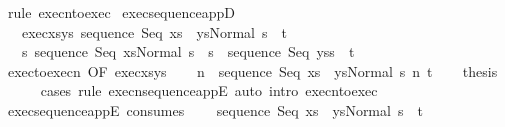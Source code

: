 \begin{isabellebody}
\ {\isacharparenleft}rule\ execn{\isacharunderscore}to{\isacharunderscore}exec{\isacharparenright}\isanewline
{}\isamarkupfalse%
%
\endisatagproof
{\isafoldproof}%
%
\isadelimproof
\isanewline
%
\endisadelimproof
\isanewline
{}\isamarkupfalse%
\ exec{\isacharunderscore}sequence{\isacharunderscore}appD{\isacharcolon}\ \isanewline
\ \ \ exec{\isacharunderscore}xs{\isacharunderscore}ys{\isacharcolon}\ {\isachardoublequoteopen}{\isasymGamma}{\isasymturnstile}{\isasymlangle}sequence\ Seq\ {\isacharparenleft}xs\ {\isacharat}\ ys{\isacharparenright}{\isacharcomma}Normal\ s{\isasymrangle}\ {\isasymRightarrow}\ t{\isachardoublequoteclose}\isanewline
\ \ \ {\isachardoublequoteopen}{\isasymexists}s{\isacharprime}{\isachardot}\ {\isasymGamma}{\isasymturnstile}{\isasymlangle}sequence\ Seq\ xs{\isacharcomma}Normal\ s{\isasymrangle}\ {\isasymRightarrow}\ s{\isacharprime}\ {\isasymand}\ {\isasymGamma}{\isasymturnstile}{\isasymlangle}sequence\ Seq\ ys{\isacharcomma}s{\isacharprime}{\isasymrangle}\ {\isasymRightarrow}\ t{\isachardoublequoteclose}\isanewline
%
\isadelimproof
%
\endisadelimproof
%
\isatagproof
{}\isamarkupfalse%
\ {\isacharminus}\isanewline
\ \ \isamarkupfalse%
\ exec{\isacharunderscore}to{\isacharunderscore}execn\ {\isacharbrackleft}OF\ exec{\isacharunderscore}xs{\isacharunderscore}ys{\isacharbrackright}\isanewline
\ \ \isamarkupfalse%
\ n\ \ {\isachardoublequoteopen}{\isasymGamma}{\isasymturnstile}{\isasymlangle}sequence\ Seq\ {\isacharparenleft}xs\ {\isacharat}\ ys{\isacharparenright}{\isacharcomma}Normal\ s{\isasymrangle}\ {\isacharequal}n{\isasymRightarrow}\ t{\isachardoublequoteclose}\isacommand{{\isachardot}{\isachardot}}\isamarkupfalse%
\isanewline
\ \ \isamarkupfalse%
\ {\isacharquery}thesis\isanewline
\ \ \ \ \isamarkupfalse%
\ {\isacharparenleft}cases\ rule{\isacharcolon}\ execn{\isacharunderscore}sequence{\isacharunderscore}appE{\isacharparenright}\ {\isacharparenleft}auto\ intro{\isacharcolon}\ execn{\isacharunderscore}to{\isacharunderscore}exec{\isacharparenright}\isanewline
{}\isamarkupfalse%
%
\endisatagproof
{\isafoldproof}%
%
\isadelimproof
\isanewline
%
\endisadelimproof
\isanewline
\isanewline
{}\isamarkupfalse%
\ exec{\isacharunderscore}sequence{\isacharunderscore}appE\ {\isacharbrackleft}consumes\ {}{\isacharbrackright}{\isacharcolon}\ \isanewline
\ \ {\isachardoublequoteopen}{\isasymlbrakk}{\isasymGamma}{\isasymturnstile}{\isasymlangle}sequence\ Seq\ {\isacharparenleft}xs\ {\isacharat}\ ys{\isacharparenright}{\isacharcomma}Normal\ s{\isasymrangle}\ {\isasymRightarrow}\ t{\isacharsemicolon}\isanewline

\end{isabellebody}
